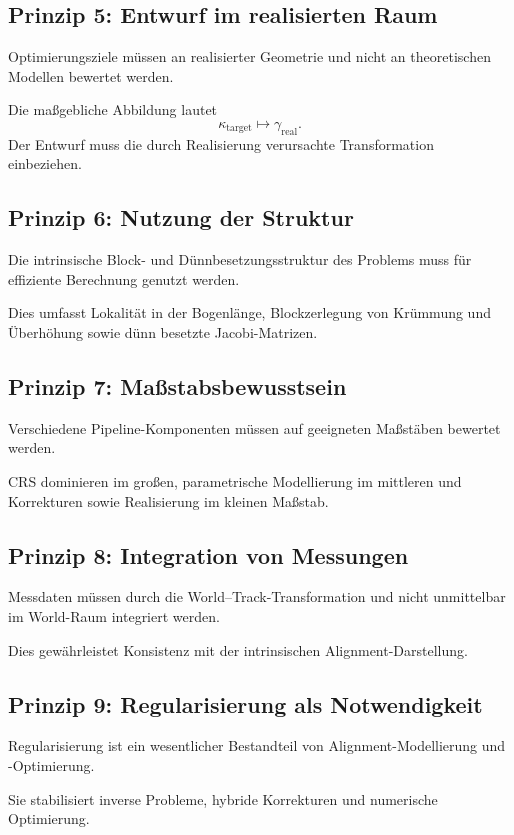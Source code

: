 \subsection{Prinzip 5: Entwurf im realisierten Raum}
\begin{proposition}
Optimierungsziele müssen an realisierter Geometrie und nicht an theoretischen
Modellen bewertet werden.
\end{proposition}
Die maßgebliche Abbildung lautet
\[
\kappa_{\mathrm{target}}\mapsto\gamma_{\mathrm{real}}.
\]
Der Entwurf muss die durch Realisierung verursachte Transformation einbeziehen.

\subsection{Prinzip 6: Nutzung der Struktur}
\begin{proposition}
Die intrinsische Block- und Dünnbesetzungsstruktur des Problems muss für
effiziente Berechnung genutzt werden.
\end{proposition}
Dies umfasst Lokalität in der Bogenlänge, Blockzerlegung von Krümmung und
Überhöhung sowie dünn besetzte Jacobi-Matrizen.

\subsection{Prinzip 7: Maßstabsbewusstsein}
\begin{proposition}
Verschiedene Pipeline-Komponenten müssen auf geeigneten Maßstäben bewertet
werden.
\end{proposition}
CRS dominieren im großen, parametrische Modellierung im mittleren und
Korrekturen sowie Realisierung im kleinen Maßstab.

\subsection{Prinzip 8: Integration von Messungen}
\begin{proposition}
Messdaten müssen durch die World--Track-Transformation und nicht unmittelbar
im World-Raum integriert werden.
\end{proposition}
Dies gewährleistet Konsistenz mit der intrinsischen Alignment-Darstellung.

\subsection{Prinzip 9: Regularisierung als Notwendigkeit}
\begin{proposition}
Regularisierung ist ein wesentlicher Bestandteil von Alignment-Modellierung
und -Optimierung.
\end{proposition}
Sie stabilisiert inverse Probleme, hybride Korrekturen und numerische
Optimierung.

